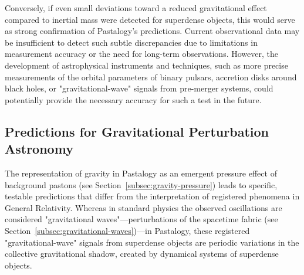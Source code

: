 \documentclass[pdflatex,sn-mathphys-num]{sn-jnl}
\begin{document}
Conversely, if even small deviations toward a reduced gravitational effect compared to inertial mass were detected for superdense objects, this would serve as strong confirmation of Pastalogy's predictions. Current observational data may be insufficient to detect such subtle discrepancies due to limitations in measurement accuracy or the need for long-term observations. However, the development of astrophysical instruments and techniques, such as more precise measurements of the orbital parameters of binary pulsars, accretion disks around black holes, or "gravitational-wave" signals from pre-merger systems, could potentially provide the necessary accuracy for such a test in the future.

\subsection{Predictions for Gravitational Perturbation Astronomy}\label{subsec:gravitational-astronomy}

The representation of gravity in Pastalogy as an emergent pressure effect of background pastons (see Section~\ref{subsec:gravity-pressure}) leads to specific, testable predictions that differ from the interpretation of registered phenomena in General Relativity. Whereas in standard physics the observed oscillations are considered "gravitational waves"---perturbations of the spacetime fabric (see Section~\ref{subsec:gravitational-waves})---in Pastalogy, these registered "gravitational-wave" signals from superdense objects are periodic variations in the collective gravitational shadow, created by dynamical systems of superdense objects.
\end{document}
